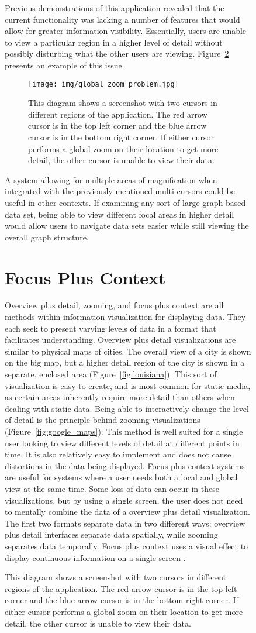 \begin{figure}[htp]
{Previous demonstrations of this application revealed that the current functionality was lacking a number of features that would allow for greater information visibility. Essentially, users are unable to view a particular region in a higher level of detail without possibly disturbing what the other users are viewing. Figure~\ref{fig:example_problem} presents an example of this issue.

\begin{figure}[htp] \centering
    \texttt{[image: img/global\_zoom\_problem.jpg]}
    \caption[Loss of Context]{This diagram shows a screenshot with two cursors in different regions of the application. The red arrow cursor is in the top left corner and the blue arrow cursor is in the bottom right corner. If either cursor performs a global zoom on their location to get more detail, the other cursor is unable to view their data.}
    \label{fig:example_problem}
\end{figure}

A system allowing for multiple areas of magnification when integrated with the previously mentioned multi-cursors could be useful in other contexts. If examining any sort of large graph based data set, being able to view different focal areas in higher detail would allow users to navigate data sets easier while still viewing the overall graph structure.

\section{Focus Plus Context}
\label{section:intro_fac}
Overview plus detail, zooming, and focus plus context are all methods within information visualization for displaying data. They each seek to present varying levels of data in a format that facilitates understanding. Overview plus detail visualizations are similar to physical maps of cities. The overall view of a city is shown on the big map, but a higher detail region of the city is shown in a separate, enclosed area (Figure~\ref{fig:louisiana}). This sort of visualization is easy to create, and is most
common for static media, as certain areas inherently require more detail than others when dealing with static data. Being able to interactively change the level of detail is the principle behind zooming visualizations (Figure~\ref{fig:google_maps}). This method is well suited for a single user looking to view different levels of detail at different points in time. It is also relatively easy to implement and does not cause distortions in the data being displayed. Focus plus context systems are useful for systems
where a user needs both a local and global view at the same time. Some loss of data can occur in these visualizations, but by using a single screen, the user does not need to mentally combine the data of a overview plus detail visualization. The first two formats separate data in two
different ways: overview plus detail interfaces separate data spatially, while zooming separates data temporally. Focus plus context uses a visual effect to display continuous information on a single screen \cite{Cockburn2008}. 

}
\end{figure}

